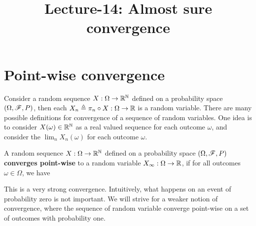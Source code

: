 \documentclass[letterpaper,10pt,english]{article}
\title{Lecture-14: Almost sure convergence}%
\author{}
\begin{document}
\maketitle

\section{Point-wise convergence}
Consider a random sequence $X:\Omega\to\mathbb{R}^{\mathbb{N}}$ defined on a probability space $(\Omega, \mathscr{F}, P)$, 
then each $X_n \triangleq \pi_n\circ X: \Omega \to \mathbb{R}$ is a random variable. 
There are many possible definitions for convergence of a sequence of random variables. 
One idea is to consider $X(\omega)\in \mathbb{R}^{\mathbb{N}}$ as a real valued sequence for each outcome $\omega$, 
and consider the $\lim_nX_n(\omega)$ for each outcome $\omega$. 
\begin{defn}%
A random sequence $X:\Omega\to\mathbb{R}^{\mathbb{N}}$ defined on a probability space $(\Omega, \mathscr{F}, P)$ \textbf{converges point-wise} to a random variable $X_\infty:\Omega \to \mathbb{R}$, if for all outcomes $\omega \in \Omega$, we have 
\end{defn}
\begin{rem} 
This is a very strong convergence. 
Intuitively, what happens on an event of probability zero is not important. 
We will strive for a weaker notion of convergence, 
where the sequence of random variable converge point-wise on a set of outcomes with probability one.
\end{rem}
\end{document}
